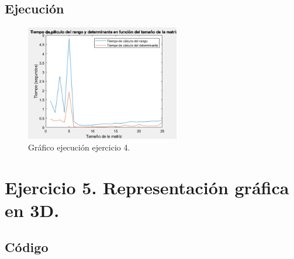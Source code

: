 \documentclass[a4paper, 12pt]{article}
\begin{document}
	\subsection{Ejecución}
	\begin{figure}[htp!]
		\centering
		\includegraphics[width=0.6\textwidth]{figures/graf4.png}
		\caption{Gráfico ejecución ejercicio 4.}
	\end{figure}
	\newpage
	
	\section{Ejercicio 5. Representación gráfica en 3D.}
	
	\subsection{Código}
	\inputminted[fontsize=\scriptsize, linenos, breaklines=true, xleftmargin=0.75cm, frame=lines]{matlab}{code/Ejercicio5.m}
	\newpage
\end{document}
